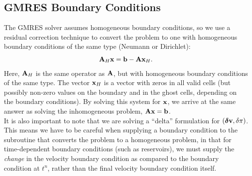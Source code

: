 \documentclass[final]{siamltex}
\def\Ab {{\bf A}}
\def\bb {{\bf b}}
\def\vb {{\bf v}}
\def\xb {{\bf x}}
\def\deltab {\boldsymbol{\delta}}
\begin{document}
\subsection{GMRES Boundary Conditions}
The GMRES solver assumes homogeneous boundary conditions,
so we use a residual correction technique to convert the problem to one
with homogeneous boundary conditions of the same type (Neumann or Dirichlet):
\begin{equation}
\Ab_H\xb = \bb - \Ab\xb_H.
\end{equation}
Here, $\Ab_H$ is the same operator as $\Ab$, but with homogeneous boundary conditions
of the same type.
The vector $\xb_H$ is a vector with zeros in all valid cells (but possibly
non-zero values on the boundary and in the ghost cells, depending on the 
boundary conditions).
By solving this system for $\xb$, we arrive at the same answer as solving the
inhomogeneous problem, $\Ab\xb=\bb$.\\

It is also important to note that we are solving a ``delta'' formulation for
$(\deltab\vb,\delta\pi)$.  This means we have to be careful when supplying
a boundary condition to the subroutine that converts the problem to a homogeneous
problem, in that for time-dependent boundary conditions (such as reservoirs), we
must supply the {\it change} in the velocity boundary condition as compared to
the boundary condition at $t^n$, rather than the final velocity boundary 
condition itself.
\end{document}
